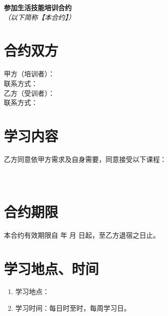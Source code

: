 \documentclass[12pt]{article}
\begin{document}
\allsectionsfont{\sffamily}
	\begin{center}
		\huge\textsf{\textbf{参加生活技能培训合约}}\\
		\normalsize\textit{（以下简称【本合约】）}
	\end{center}
	\section{合约双方}
		
		\noindent 甲方（培训者）：\underline{\hspace{20em}}\\
		联系方式：\underline{\hspace{22.5em}}\\
		
		\noindent 乙方（受训者）：\underline{\hspace{20em}}\\
		联系方式：\underline{\hspace{22.5em}}\\
	
	\section{学习内容}
		\noindent 乙方同意依甲方需求及自身需要，同意接受以下课程：\\
		\underline{\hspace{15cm}}\\
		\underline{\hspace{15cm}}\\
	\section{合约期限}
		本合约有效期限自 \underline{\hspace{2cm}} 年 \underline{\hspace{1cm}} 月 \underline{\hspace{1cm}} 日起，至乙方退宿之日止。
	\section{学习地点、时间}
		\begin{enumerate}
			\item 学习地点：\underline{\hspace{19em}}
			\item 学习时间：每日\underline{\hspace{2em}}时至\underline{\hspace{2em}}时，每周学习\underline{\hspace{2em}}日。
		\end{enumerate}
\end{document}
